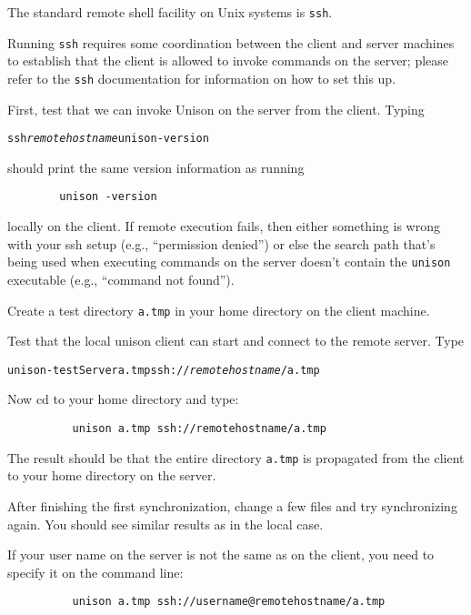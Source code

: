 \documentclass{article}
\newcommand{\NT}[1]{\textit{#1}}
\begin{document}

The standard remote shell facility on Unix systems is \verb|ssh|.

Running
\verb|ssh| requires some coordination between the client and server
machines to establish that the client is allowed to invoke commands on
the server; please refer to the \verb|ssh| documentation
for information on how to set this up.

First, test that we can invoke Unison on the server from the client.
Typing
\begin{alltt}
        ssh \NT{remotehostname} unison -version
\end{alltt}
should print the same version information as running
\begin{verbatim}
        unison -version
\end{verbatim}
locally on the client.  If remote execution fails, then either
something is wrong with your ssh setup (e.g., ``permission denied'')
or else the search path that's being used when executing commands on
the server doesn't contain the \verb|unison| executable (e.g.,
``command not found'').

Create a test directory {\tt a.tmp} in your home directory on the client
machine.

Test that the local unison client can start and connect to the
remote server.  Type
\begin{alltt}
          unison -testServer a.tmp ssh://\NT{remotehostname}/a.tmp
\end{alltt}

Now cd to your home directory and type:
\begin{verbatim}
          unison a.tmp ssh://remotehostname/a.tmp
\end{verbatim}
The result should be that the entire directory {\tt a.tmp} is propagated
from the client to your home directory on the server.

After finishing the first synchronization, change a few files and try
synchronizing again.  You should see similar results as in the local
case.

If your user name on the server is not the same as on the client, you
need to specify it on the command line:
\begin{verbatim}
          unison a.tmp ssh://username@remotehostname/a.tmp
\end{verbatim}
\end{document}
